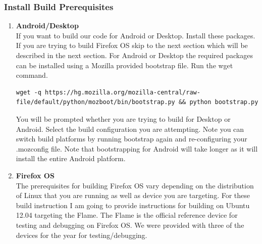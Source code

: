 \documentclass[12pt]{article}
\begin{document}
\subsubsection{Install Build Prerequisites}
	\begin{enumerate}
	\item \textbf{Android/Desktop} \\
	If you want to build our code for Android or Desktop. Install these packages.  If you are trying to
	build Firefox OS skip to the next section which will be described in the next section. For Android or 
	Desktop the required packages can be installed using a Mozilla provided bootstrap file.  Run the
	wget command.  
	
	\begin{lstlisting}[style=BashInputStyle, breaklines=true]
	wget -q https://hg.mozilla.org/mozilla-central/raw-file/default/python/mozboot/bin/bootstrap.py && python bootstrap.py
	\end{lstlisting}

	You will be prompted whether you are trying to build for Desktop or Android. Select the build configuration you are  		attempting.  Note you can switch build platforms by running bootstrap again and re-configuring your .mozconfig file.  Note that bootstrapping for Android will take longer as it will install the entire Android platform.
	\item \textbf{Firefox OS}\\
	The prerequisites for building Firefox OS vary depending on the distribution of Linux that you are running as well as device you are targeting.  For these build instruction I am going to provide instructions for building on Ubuntu 12.04 targeting the Flame. The Flame is the official reference device for testing and debugging on Firefox OS.  We were provided with three of the devices for the year for testing/debugging.  
	

\end{enumerate}
\end{document}
